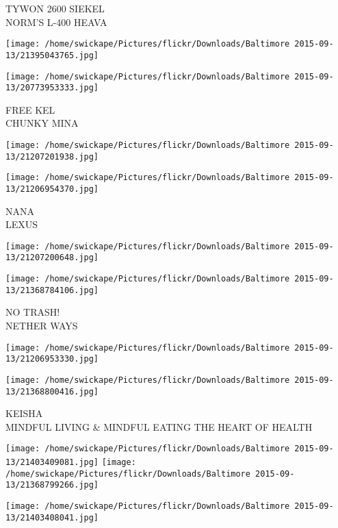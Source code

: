 \documentclass[10pt,letterpaper]{article}
\begin{document}
TYWON 2600 SIEKEL\\
NORM'S L{-}400 HEAVA\\
\pagebreak

\texttt{[image: /home/swickape/Pictures/flickr/Downloads/Baltimore 2015-09-13/21395043765.jpg]}

\vspace{0.25in}
\texttt{[image: /home/swickape/Pictures/flickr/Downloads/Baltimore 2015-09-13/20773953333.jpg]}

FREE KEL\\
CHUNKY MINA\\
\pagebreak

\texttt{[image: /home/swickape/Pictures/flickr/Downloads/Baltimore 2015-09-13/21207201938.jpg]}

\vspace{0.25in}
\texttt{[image: /home/swickape/Pictures/flickr/Downloads/Baltimore 2015-09-13/21206954370.jpg]}

NANA\\
LEXUS\\
\pagebreak

\texttt{[image: /home/swickape/Pictures/flickr/Downloads/Baltimore 2015-09-13/21207200648.jpg]}

\vspace{0.25in}
\texttt{[image: /home/swickape/Pictures/flickr/Downloads/Baltimore 2015-09-13/21368784106.jpg]}

NO TRASH!\\
NETHER WAYS\\
\pagebreak

\texttt{[image: /home/swickape/Pictures/flickr/Downloads/Baltimore 2015-09-13/21206953330.jpg]}

\vspace{0.25in}
\texttt{[image: /home/swickape/Pictures/flickr/Downloads/Baltimore 2015-09-13/21368800416.jpg]}

KEISHA\\
MINDFUL LIVING \& MINDFUL EATING THE HEART OF HEALTH\\
\pagebreak

\texttt{[image: /home/swickape/Pictures/flickr/Downloads/Baltimore 2015-09-13/21403409081.jpg]}
\texttt{[image: /home/swickape/Pictures/flickr/Downloads/Baltimore 2015-09-13/21368799266.jpg]}

\vspace{0.25in}
\texttt{[image: /home/swickape/Pictures/flickr/Downloads/Baltimore 2015-09-13/21403408041.jpg]}
\end{document}
